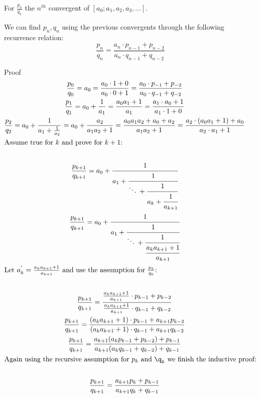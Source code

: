 \documentclass[a4paper]{article}
\begin{document}
    \begin{lemma}
        \label{lemma1}
        For $\frac{p_{n}}{q_n}$ the $n^{th}$ convergent of $[a_0; a_1, a_2, a_3, \dots]$.

        We can find $p_n, q_n$ using the previous convergents through the following recurrence relation:
        \[
        \frac{p_{n}}{q_n} = \frac{a_n \cdot p_{n-1} + p_{n-2}}{a_n \cdot q_{n-1} + q_{n-2}}
        \]

        Proof
        \begin{gather*}
            \frac{p_{0}}{q_0} = a_0 = \frac{a_0 \cdot 1 + 0}{a_0 \cdot 0 + 1}
              = \frac{a_0 \cdot p_{-1} + p_{-2}}{a_0 \cdot q_{-1} + q_{-2}} \\
            \frac{p_{1}}{q_1} = a_0 + \frac{1}{a_1} = \frac{a_{0} a_{1} + 1}{a_1}
              = \frac{a_1 \cdot a_0 + 1}{a_1 \cdot 1 + 0} \\
            \frac{p_{2}}{q_2} = a_0 + \frac{1}{a_1 + \frac{1}{a_2}} = a_0 + \frac{a_2}{a_1 a_2 + 1}
            = \frac{a_{0} a_{1} a_2 + a_0 + a_2}{a_1 a_2 + 1}
              = \frac{a_2 \cdot (a_0 a_1 + 1) + a_0}{a_2 \cdot a_1 + 1} \\
            \shortintertext{Assume true for \( k \)  and prove for  \( k+1 \):} \\
            \frac{p_{k+1}}{q_{k+1}} = a_0 + \cfrac{1}{a_1 + \cfrac{1}{\ddots \, + \cfrac{1}{a_{k} + \cfrac{1}{a_{k+1}} }}} \\
            \frac{p_{k+1}}{q_{k+1}} = a_0 + \cfrac{1}{a_1 + \cfrac{1}{\ddots \, + \cfrac{1}{\cfrac{a_{k} a_{k+1} + 1}{a_{k+1}} }}} \\
            \shortintertext{Let \( a_{k}^{'} = \frac{a_{k} a_{k+1} + 1}{a_{k+1}} \)  and use the assumption for \( \frac{p_k}{q_k} \):} \\
            \frac{p_{k+1}}{q_{k+1}} = \frac{\frac{a_{k} a_{k+1} + 1}{a_{k+1}} \cdot p_{k-1} + p_{k-2}}{\frac{a_{k} a_{k+1} + 1}{a_{k+1}} \cdot q_{k-1} + q_{k-2}}  \\
            \frac{p_{k+1}}{q_{k+1}} = \frac{(a_{k} a_{k+1} + 1) \cdot p_{k-1} + a_{k+1} p_{k-2} }{(a_{k} a_{k+1} + 1) \cdot q_{k-1} + a_{k+1} q_{k-2}}  \\
            \frac{p_{k+1}}{q_{k+1}} = \frac{a_{k+1} (a_{k}  p_{k-1} + p_{k-2}) + p_{k-1}}{a_{k+1} (a_{k} q_{k-1} + q_{k-2})  + q_{k-1}}  \\
            \shortintertext{Again using the recursive assumption for \( p_k \) and \( \q_k \)  we finish the inductive proof:} \\
            \frac{p_{k+1}}{q_{k+1}} = \frac{a_{k+1} p_{k} + p_{k-1}}{a_{k+1} q_{k}  + q_{k-1}}  \\
        \end{gather*}
    \end{lemma}
\end{document}
